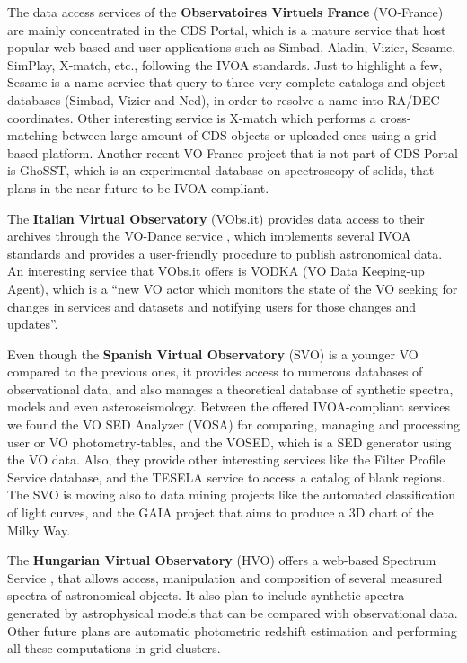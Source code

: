 The data access services of the \textbf{Observatoires Virtuels France}
(VO-France) are mainly concentrated in the 
CDS Portal, which is a mature service that host popular web-based and
user applications such as Simbad, Aladin, Vizier, Sesame, SimPlay, X-match,
etc., following the IVOA standards. 
Just to highlight a few, Sesame is a name service that query to 
three very complete catalogs and object databases (Simbad, Vizier and Ned),
in order to resolve a name into RA/DEC coordinates. Other interesting 
service is X-match which performs a cross-matching between large amount
of CDS objects or uploaded ones using a grid-based platform.
Another recent VO-France project that is not part of CDS Portal 
is GhoSST, %
which is an experimental database on spectroscopy of solids, that
plans in the near future to be IVOA compliant.

The \textbf{Italian Virtual Observatory} (VObs.it) provides data access to
their archives through the VO-Dance service \cite{Smareglia2001},
which implements several IVOA standards and provides a user-friendly procedure 
to publish astronomical data. An interesting service that VObs.it offers is
VODKA (VO Data Keeping-up Agent), which is a ``new VO actor which monitors the
state of the VO seeking for changes in services and datasets and notifying users
for those changes and updates''. \cite{Laurino2011}

Even though the \textbf{Spanish Virtual Observatory} (SVO) is a younger VO
compared to the previous ones, it
provides access to numerous databases of observational data, and also manages a
theoretical database of synthetic spectra, models and even asteroseismology.
Between the offered IVOA-compliant services we found the VO SED Analyzer (VOSA)
for comparing, managing and processing user or VO photometry-tables,
and the VOSED, which is a SED generator using the VO data.
Also, they provide other interesting services like the Filter Profile Service
database, and the TESELA service \cite{Cardiel2011} to access a catalog 
of blank regions.
The SVO is moving also to data mining projects like the automated classification
of light curves, and the GAIA project that aims to produce a 3D chart of the 
Milky Way. 

The \textbf{Hungarian Virtual Observatory} (HVO) offers a web-based Spectrum
Service \cite{Dobos2006},
that allows access, manipulation and composition of
several measured spectra of astronomical objects. It
also plan to include synthetic spectra generated by
astrophysical models that can be compared with observational
data. Other future plans are automatic photometric redshift 
estimation and performing all these computations in grid clusters. 

